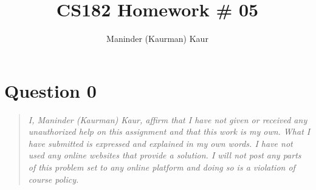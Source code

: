 \documentclass[11pt]{article}
\title{CS182 Homework \# 05}
\author{Maninder (Kaurman) Kaur}
\begin{document}
\maketitle

\section*{Question 0}
\begin{quote}
    \textit{I, Maninder (Kaurman) Kaur, affirm that I have not given or received any unauthorized help on this assignment and that this work is my own. What I have submitted is expressed and explained in my own words. I have not used any online websites that provide a solution. I will not post any parts of this problem set to any online platform and doing so is a violation of course policy.}
\end{quote}
\end{document}
